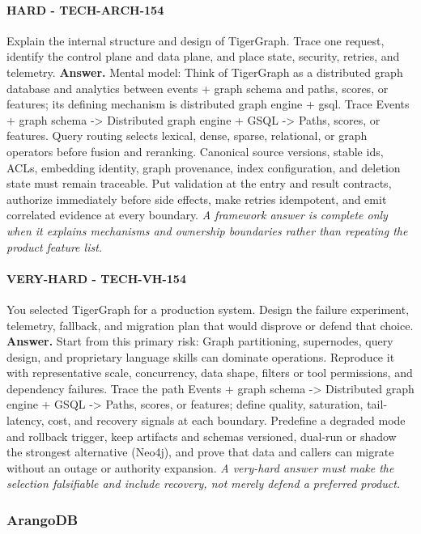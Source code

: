 \paragraph{HARD - TECH-ARCH-154} Explain the internal structure and design of TigerGraph. Trace one request, identify the control plane and data plane, and place state, security, retries, and telemetry.
\textbf{Answer.} Mental model: Think of TigerGraph as a distributed graph database and analytics between events + graph schema and paths, scores, or features; its defining mechanism is distributed graph engine + gsql. Trace Events + graph schema -> Distributed graph engine + GSQL -> Paths, scores, or features. Query routing selects lexical, dense, sparse, relational, or graph operators before fusion and reranking. Canonical source versions, stable ids, ACLs, embedding identity, graph provenance, index configuration, and deletion state must remain traceable. Put validation at the entry and result contracts, authorize immediately before side effects, make retries idempotent, and emit correlated evidence at every boundary.
\textit{A framework answer is complete only when it explains mechanisms and ownership boundaries rather than repeating the product feature list.}
\paragraph{VERY-HARD - TECH-VH-154} You selected TigerGraph for a production system. Design the failure experiment, telemetry, fallback, and migration plan that would disprove or defend that choice.
\textbf{Answer.} Start from this primary risk: Graph partitioning, supernodes, query design, and proprietary language skills can dominate operations. Reproduce it with representative scale, concurrency, data shape, filters or tool permissions, and dependency failures. Trace the path Events + graph schema -> Distributed graph engine + GSQL -> Paths, scores, or features; define quality, saturation, tail-latency, cost, and recovery signals at each boundary. Predefine a degraded mode and rollback trigger, keep artifacts and schemas versioned, dual-run or shadow the strongest alternative (Neo4j), and prove that data and callers can migrate without an outage or authority expansion.
\textit{A very-hard answer must make the selection falsifiable and include recovery, not merely defend a preferred product.}
\subsubsection*{ArangoDB}

